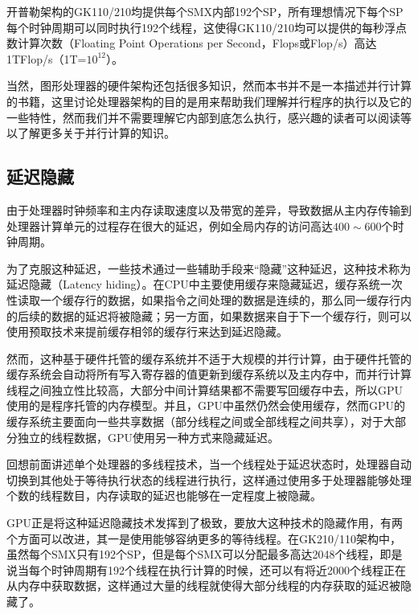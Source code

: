 开普勒架构的GK110/210均提供每个SMX内部192个SP，所有理想情况下每个SP每个时钟周期可以同时执行192个线程，这使得GK110/210均可以提供的每秒浮点数计算次数（Floating Point Operations per Second，Flops或Flop/s）高达1TFlop/s（1T=$10^{12}$）。

当然，图形处理器的硬件架构还包括很多知识，然而本书并不是一本描述并行计算的书籍，这里讨论处理器架构的目的是用来帮助我们理解并行程序的执行以及它的一些特性，然而我们并不需要理解它内部到底怎么执行，感兴趣的读者可以阅读\cite{a:NVIDIAsNextGenerationCUDATMComputeArchitecture:KeplerTMGK110/210,a:PascalArchitectureWhitepaper,a:CUDACPROGRAMMINGGUIDE}等以了解更多关于并行计算的知识。





\subsection{延迟隐藏}\label{sec-rp-latency}
由于处理器时钟频率和主内存读取速度以及带宽的差异，导致数据从主内存传输到处理器计算单元的过程存在很大的延迟，例如全局内存的访问高达$400\sim 600$个时钟周期。

为了克服这种延迟，一些技术通过一些辅助手段来“隐藏”这种延迟，这种技术称为延迟隐藏（Latency hiding）。在CPU中主要使用缓存来隐藏延迟，缓存系统一次性读取一个缓存行的数据，如果指令之间处理的数据是连续的，那么同一缓存行内的后续的数据的延迟将被隐藏；另一方面，如果数据来自于下一个缓存行，则可以使用预取技术来提前缓存相邻的缓存行来达到延迟隐藏。

然而，这种基于硬件托管的缓存系统并不适于大规模的并行计算，由于硬件托管的缓存系统会自动将所有写入寄存器的值更新到缓存系统以及主内存中，而并行计算线程之间独立性比较高，大部分中间计算结果都不需要写回缓存中去，所以GPU使用的是程序托管的内存模型。并且，GPU中虽然仍然会使用缓存，然而GPU的缓存系统主要面向一些共享数据（部分线程之间或全部线程之间共享），对于大部分独立的线程数据，GPU使用另一种方式来隐藏延迟。

回想前面讲述单个处理器的多线程技术，当一个线程处于延迟状态时，处理器自动切换到其他处于等待执行状态的线程进行执行，这样通过使用多于处理器能够处理个数的线程数目，内存读取的延迟也能够在一定程度上被隐藏。

GPU正是将这种延迟隐藏技术发挥到了极致，要放大这种技术的隐藏作用，有两个方面可以改进，其一是使用能够容纳更多的等待线程。在GK210/110架构中，虽然每个SMX只有192个SP，但是每个SMX可以分配最多高达2048个线程，即是说当每个时钟周期有192个线程在执行计算的时候，还可以有将近2000个线程正在从内存中获取数据，这样通过大量的线程就使得大部分线程的内存获取的延迟被隐藏了。

